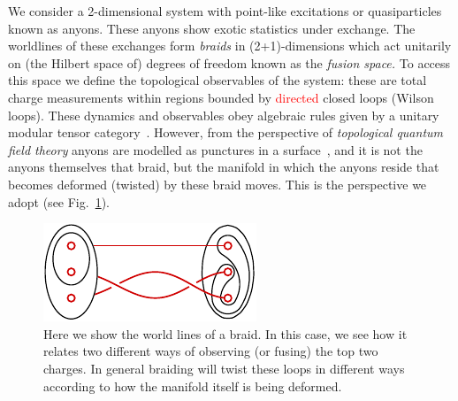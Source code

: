 \documentclass[aps, prl, letterpaper, twocolumn, superscriptaddress, notitlepage, 10pt]{revtex4-1}
\newcommand{\Fref}[1]{Fig.~\ref{#1}}
\newcommand{\cggb}[1]{\textcolor{blue}{#1}}
\newcommand{\dude}[1]{\textcolor{red}{#1}}
\begin{document}
We consider a 
2-dimensional system with
point-like excitations or quasiparticles known as anyons.
These anyons show exotic statistics under exchange.
The worldlines of these exchanges form \emph{braids}
in (2+1)-dimensions
which act unitarily on (the Hilbert space of) degrees of freedom known as the \emph{fusion space.}
To access this space we define
the topological observables of the system: these
are total charge measurements within regions bounded by \dude{directed} closed loops (Wilson loops).
These dynamics and observables obey algebraic rules
given by a unitary modular tensor category~\cite{Wang2010b}. %
However, from the perspective of
\emph{topological quantum field theory}
anyons are modelled
as punctures in a surface~\cite{Pfeifer2014}, and it is not
the anyons themselves that braid,
but the manifold in which the anyons reside 
that becomes deformed (twisted) by these braid moves.
This is the perspective we adopt (see \Fref{f:braidloop}).



\begin{figure}[t!]
\begin{center}
    \includegraphics[]{pic-braid-loop.pdf}
\caption{
Here we show the world lines of a braid.
In this case, we see how it relates two different ways of observing (or fusing) the top two charges.
In general braiding will twist these loops in different ways
according to how the manifold itself is being deformed.
\label{f:braidloop}
}
\end{center}
\vspace{-10pt}
\end{figure}
\end{document}
